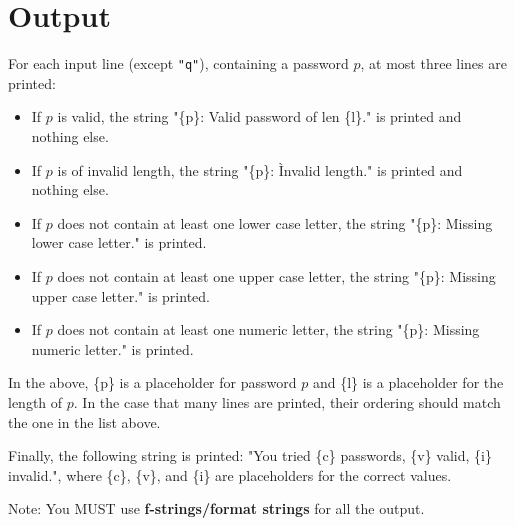 \section*{Output}
For each input line (except \texttt{"q"}), containing a password $p$, at most three lines are printed:
\begin{itemize}
    \item If $p$ is valid, the string "\{p\}: Valid password of len \{l\}." is printed and nothing else. 
    \item If $p$ is of invalid length, the string "\{p\}: Ìnvalid length." is printed and nothing else.
    \item If $p$ does not contain at least one lower case letter, the string "\{p\}: Missing lower case letter." is printed.
    \item If $p$ does not contain at least one upper case letter, the string "\{p\}: Missing upper case letter." is printed.
    \item If $p$ does not contain at least one numeric letter, the string "\{p\}: Missing numeric letter." is printed.
\end{itemize}
In the above, \{p\} is a placeholder for password $p$ and \{l\} is a placeholder for the length of $p$.
In the case that many lines are printed, their ordering should match the one in the list above.

Finally, the following string is printed:
"You tried \{c\} passwords, \{v\} valid, \{i\} invalid.", where \{c\}, \{v\}, and \{i\} are placeholders for the correct values.  

Note: You MUST use \textbf{f-strings/format strings} for all the output. 

